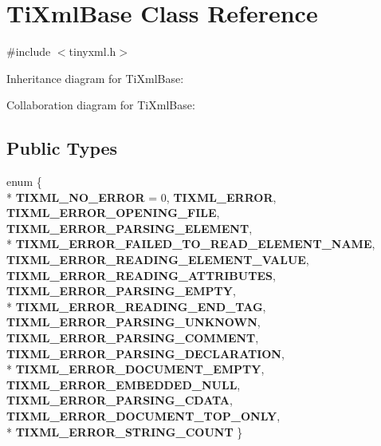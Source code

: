 \hypertarget{class_ti_xml_base}{\section{Ti\+Xml\+Base Class Reference}
\label{class_ti_xml_base}
}


{\ttfamily \#include $<$tinyxml.\+h$>$}



Inheritance diagram for Ti\+Xml\+Base\+:


Collaboration diagram for Ti\+Xml\+Base\+:
\subsection*{Public Types}
\begin{DoxyCompactItemize}
\item 
\hypertarget{class_ti_xml_base_a9fdd6b34385dfbb130e9548ba8fdcb93}{enum \{ \\*
{\bfseries T\+I\+X\+M\+L\+\_\+\+N\+O\+\_\+\+E\+R\+R\+O\+R} = 0, 
{\bfseries T\+I\+X\+M\+L\+\_\+\+E\+R\+R\+O\+R}, 
{\bfseries T\+I\+X\+M\+L\+\_\+\+E\+R\+R\+O\+R\+\_\+\+O\+P\+E\+N\+I\+N\+G\+\_\+\+F\+I\+L\+E}, 
{\bfseries T\+I\+X\+M\+L\+\_\+\+E\+R\+R\+O\+R\+\_\+\+P\+A\+R\+S\+I\+N\+G\+\_\+\+E\+L\+E\+M\+E\+N\+T}, 
\\*
{\bfseries T\+I\+X\+M\+L\+\_\+\+E\+R\+R\+O\+R\+\_\+\+F\+A\+I\+L\+E\+D\+\_\+\+T\+O\+\_\+\+R\+E\+A\+D\+\_\+\+E\+L\+E\+M\+E\+N\+T\+\_\+\+N\+A\+M\+E}, 
{\bfseries T\+I\+X\+M\+L\+\_\+\+E\+R\+R\+O\+R\+\_\+\+R\+E\+A\+D\+I\+N\+G\+\_\+\+E\+L\+E\+M\+E\+N\+T\+\_\+\+V\+A\+L\+U\+E}, 
{\bfseries T\+I\+X\+M\+L\+\_\+\+E\+R\+R\+O\+R\+\_\+\+R\+E\+A\+D\+I\+N\+G\+\_\+\+A\+T\+T\+R\+I\+B\+U\+T\+E\+S}, 
{\bfseries T\+I\+X\+M\+L\+\_\+\+E\+R\+R\+O\+R\+\_\+\+P\+A\+R\+S\+I\+N\+G\+\_\+\+E\+M\+P\+T\+Y}, 
\\*
{\bfseries T\+I\+X\+M\+L\+\_\+\+E\+R\+R\+O\+R\+\_\+\+R\+E\+A\+D\+I\+N\+G\+\_\+\+E\+N\+D\+\_\+\+T\+A\+G}, 
{\bfseries T\+I\+X\+M\+L\+\_\+\+E\+R\+R\+O\+R\+\_\+\+P\+A\+R\+S\+I\+N\+G\+\_\+\+U\+N\+K\+N\+O\+W\+N}, 
{\bfseries T\+I\+X\+M\+L\+\_\+\+E\+R\+R\+O\+R\+\_\+\+P\+A\+R\+S\+I\+N\+G\+\_\+\+C\+O\+M\+M\+E\+N\+T}, 
{\bfseries T\+I\+X\+M\+L\+\_\+\+E\+R\+R\+O\+R\+\_\+\+P\+A\+R\+S\+I\+N\+G\+\_\+\+D\+E\+C\+L\+A\+R\+A\+T\+I\+O\+N}, 
\\*
{\bfseries T\+I\+X\+M\+L\+\_\+\+E\+R\+R\+O\+R\+\_\+\+D\+O\+C\+U\+M\+E\+N\+T\+\_\+\+E\+M\+P\+T\+Y}, 
{\bfseries T\+I\+X\+M\+L\+\_\+\+E\+R\+R\+O\+R\+\_\+\+E\+M\+B\+E\+D\+D\+E\+D\+\_\+\+N\+U\+L\+L}, 
{\bfseries T\+I\+X\+M\+L\+\_\+\+E\+R\+R\+O\+R\+\_\+\+P\+A\+R\+S\+I\+N\+G\+\_\+\+C\+D\+A\+T\+A}, 
{\bfseries T\+I\+X\+M\+L\+\_\+\+E\+R\+R\+O\+R\+\_\+\+D\+O\+C\+U\+M\+E\+N\+T\+\_\+\+T\+O\+P\+\_\+\+O\+N\+L\+Y}, 
\\*
{\bfseries T\+I\+X\+M\+L\+\_\+\+E\+R\+R\+O\+R\+\_\+\+S\+T\+R\+I\+N\+G\+\_\+\+C\+O\+U\+N\+T}
 \}}\label{class_ti_xml_base_a9fdd6b34385dfbb130e9548ba8fdcb93}


\end{DoxyCompactItemize}
